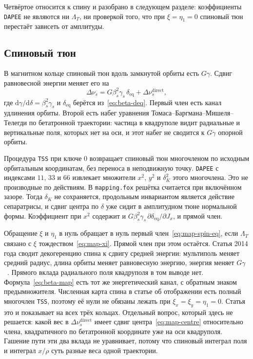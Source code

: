 Четвёртое относится к спину и разобрано в следующем разделе: коэффициенты \texttt{DAPEE} не являются ни $\Lambda_T$, ни проверкой того, что при $\xi=\eta_1=0$ спиновый тюн перестаёт зависеть от амплитуды.

\subsection{Спиновый тюн}
\label{sec:map-spin}

В магнитном кольце спиновый тюн вдоль замкнутой орбиты есть $G\gamma$. Сдвиг равновесной энергии меняет его на
\begin{equation}
\label{eq:map-spin-eq}
\Delta\nu_s
=
G\beta_s^2\gamma_s\,\delta_{\mathrm{eq}}
+\Delta\nu_s^{\mathrm{direct}},
\end{equation}
где $\mathrm{d}\gamma/\mathrm{d}\delta=\beta_s^2\gamma_s$ и $\delta_{\mathrm{eq}}$ берётся из~\eqref{eq:beta-deq}. Первый член есть канал удлинения орбиты. Второй есть набег уравнения Томаса--Баргмана--Мишеля--Телегди по бетатронной траектории: частица в квадруполе видит радиальные и вертикальные поля, которых нет на оси, и этот набег не сводится к $G\gamma$ опорной орбиты.

Процедура \texttt{TSS} при ключе $0$ возвращает спиновый тюн многочленом по исходным орбитальным координатам, без переноса в неподвижную точку. \texttt{DAPEE} с индексами $11$, $33$ и $66$ извлекает множители $x^2$, $y^2$ и $\delta_K^2$ этого многочлена. Это не производные по действиям. В \texttt{mapping.fox} решётка считается при включённом зазоре. Тогда $\delta_K$ не сохраняется, продольным инвариантом является действие сепаратрисы, и сдвиг центра по $\delta$ уже сидит в амплитудном тюне нормальной формы. Коэффициент при $x^2$ содержит и $G\beta_s^2\gamma_s\,\partial\delta_{\mathrm{eq}}/\partial J_x$, и прямой член.

Обращение $\xi$ и $\eta_1$ в нуль обращает в нуль первый член~\eqref{eq:map-spin-eq}, если $\Lambda_T$ связано с $\xi$ тождеством~\eqref{eq:map-xi}. Прямой член при этом остаётся. Статья 2014 года сводит декогеренцию спина к сдвигу средней энергии: мультиполь меняет средний радиус, длина орбиты меняет равновесную энергию, энергия меняет $G\gamma$~\cite{Senichev2014}. Прямого вклада радиального поля квадруполя в том выводе нет. Формула~\eqref{eq:beta-map} есть тот же энергетический канал, с обратным знаком предымножителя. Численная карта спина в статье об отображении есть полный многочлен \texttt{TSS}, поэтому её нули не обязаны лежать при $\xi_x=\xi_y=\eta_1=0$. Статья это и показывает на всех трёх кольцах. Отдельный вопрос, который здесь не решается: какой вес в $\Delta\nu_s^{\mathrm{direct}}$ имеет сдвиг центра~\eqref{eq:map-centre} относительно члена, квадратичного по бетатронной координате уже на оси квадруполя. Гашение пути эти два вклада не уравнивает, потому что спиновый интеграл поля и интеграл $x/\rho$ суть разные веса одной траектории.

